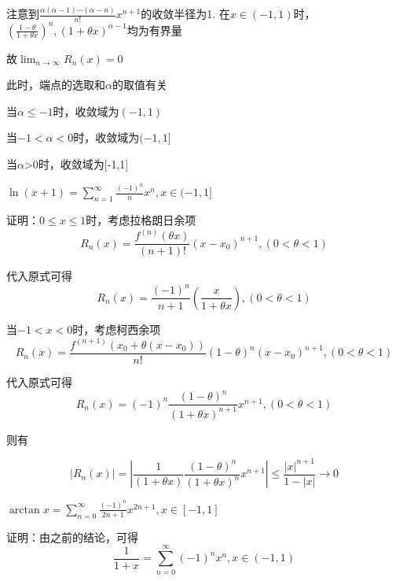 \documentclass[lang=cn,10pt]{elegantbook}
\begin{document}
	注意到$\frac{\alpha(\alpha-1)\cdots(\alpha-n)}{n!}x^{n+1}$的收敛半径为1.
	在$x \in (-1,1)$时，$(\frac{1-\theta}{1+\theta x})^{n},(1+\theta x)^{\alpha -1}$均为有界量
	
	故$\lim_{n \to \infty} R_{n}(x)=0$

此时，端点的选取和$\alpha$的取值有关
	
	当$\alpha \le -1$时，收敛域为$(-1,1)$
	
	当$-1<\alpha<0$时，收敛域为$(-1,1]$
	
	当$\alpha$>0时，收敛域为[-1,1]
\begin{conclusion}
	$\ln (x+1)=\sum_{n=1}^{\infty }  \frac{(-1)^{n}}{n}x^{n},x\in(-1,1]$
\end{conclusion}

证明：$0\le x \le 1$时，考虑拉格朗日余项
\begin{equation*}
	R_{n}(x)=\frac{{f}^{(n)}(\theta x)}{(n+1)!}(x-x_{0})^{n+1},(0<\theta<1)
\end{equation*}

代入原式可得
\begin{equation*}
	R_{n}(x)=\frac{(-1)^{n}}{n+1} (\frac{x}{1+\theta x}),(0<\theta<1)
\end{equation*}

当$-1<x<0$时，考虑柯西余项
\begin{equation*}
	R_{n}(x)=\frac{{f}^{(n+1)}(x_{0}+\theta(x-x_{0}))}{n!}(1-\theta)^{n}(x-x_{0})^{n+1}, (0<\theta<1)
\end{equation*}	

代入原式可得
\begin{equation*}
	R_{n}(x)=(-1)^{n}\frac{(1-\theta)^{n}}{(1+\theta x)^{n+1}}x^{n+1}, (0<\theta<1)
\end{equation*}

则有

\begin{equation*}
	|R_{n}(x)|=|\frac{1}{(1+\theta x)} \frac{(1-\theta)^{n}}{(1+\theta x)^{n}}x^{n+1}| \le \frac{|x|^{n+1}}{1-|x|}\longrightarrow 0
\end{equation*}

\begin{conclusion}
	$\arctan x=\sum_{n=0}^{\infty }  \frac{(-1)^{n}}{2n+1}x^{2n+1},x\in[-1,1]$
\end{conclusion}	

证明：由之前的结论，可得
\begin{equation*}
	\frac{1}{1+x}=\sum_{n=0}^{\infty }(-1)^{n}x^{n},x \in (-1,1)
\end{equation*}
\end{document}
